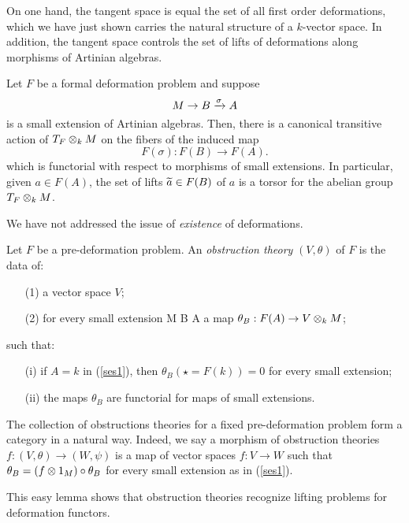 \documentclass[11pt]{amsart}
\begin{document}
On one hand, the tangent space is equal the set of all first order deformations, which we have just shown carries the natural structure of a $k$-vector space. 
In addition, the tangent space controls the set of lifts of deformations along morphisms of Artinian algebras. 

\begin{prop}
Let $F$ be a formal deformation problem and suppose 
\[
M \to B \xto{\sigma} A
\]
is a small extension of Artinian algebras.
Then, there is a canonical transitive action of $T_F \tensor_k M$ on the fibers of the induced map
\[
F(\sigma) : F(B) \to F(A) .
\] 
which is functorial with respect to morphisms of small extensions. 
In particular, given $a \in F(A)$, the set of lifts $\Tilde{a} \in F(B)$ of $a$ is a torsor for the abelian group $T_F \tensor_k M$. 
\end{prop}

We have not addressed the issue of {\em existence} of deformations. 

\begin{dfn}\label{dfn: obs}
Let $F$ be a pre-deformation problem. 
An {\em obstruction theory} $(V, \theta)$ of $F$ is the data of:
\begin{enumerate}
\item[(1)] a vector space $V$;
\item[(2)] for every small extension
\beqn\label{ses1}
M \to B \to A
\eeqn
a map $\theta_{B} : F(A) \to V \tensor_k M$;
\end{enumerate}
such that:
\begin{enumerate}
\item[(i)] if $A = k$ in (\ref{ses1}), then $\theta_{B} (\star = F(k)) = 0$ for every small extension;
\item[(ii)] the maps $\theta_{B}$ are functorial for maps of small extensions. 
\end{enumerate}
\end{dfn}

The collection of obstructions theories for a fixed pre-deformation problem form a category in a natural way. 
Indeed, we say a morphism of obstruction theories $f : (V, \theta) \to (W, \psi)$ is a map of vector spaces $f : V \to W$ such that $\theta_B = (f \tensor 1_M) \circ \theta_B$ for every small extension as in (\ref{ses1}). 

This easy lemma shows that obstruction theories recognize lifting problems for deformation functors. 
\end{document}
